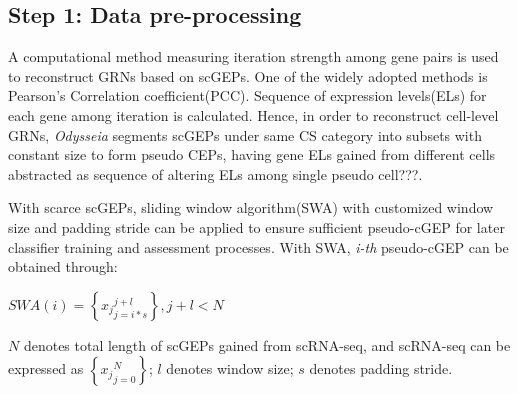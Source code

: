 \documentclass[fleqn,10pt]{wlscirep}
\begin{document}
\subsection*{Step 1: Data pre-processing}
\label{step1}
A computational method measuring iteration strength among gene pairs is used to reconstruct GRNs based on scGEPs.
One of the widely adopted methods is Pearson's Correlation coefficient(PCC)\cite{cid_2019, pcc_2012}.
Sequence of expression levels(ELs) for each gene among iteration is calculated.
Hence, in order to reconstruct cell-level GRNs, \emph{Odysseia} segments scGEPs under same CS category into subsets with constant size to form pseudo CEPs, having gene ELs gained from different cells abstracted as sequence of altering ELs among single pseudo cell???.

With scarce scGEPs, sliding window algorithm(SWA) with customized window size and padding stride can be applied to ensure sufficient pseudo-cGEP for later classifier training and assessment processes. With SWA, \emph{i-th} pseudo-cGEP can be obtained through:

\centerline{$SWA(i) = \left\{{x_j}_{j = i * s}^{j + l}\right\}, j + l < N$}
$N$ denotes total length of scGEPs gained from scRNA-seq, and scRNA-seq can be expressed as $\left\{{x_j}_{j = 0}^{N}\right\}$; $l$ denotes window size; $s$ denotes padding stride.
\end{document}
